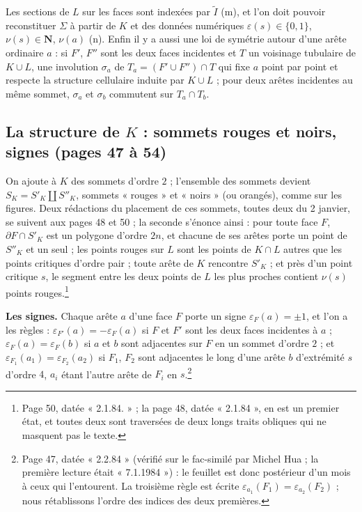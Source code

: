 \documentclass[11pt,a4paper]{article}
\begin{document}
Les sections de $L$ sur les faces
sont indexées par $\widetilde{I}$ (m), et l'on doit pouvoir reconstituer
$\Sigma$ à partir de $K$ et des données numériques $\varepsilon(s) \in \lbrace
0, 1 \rbrace$, $\nu(s) \in \mathbf{N}$, $\nu(a)$ (n). Enfin il y a aussi une loi
de symétrie autour d'une arête ordinaire $a$ : si $F'$, $F''$ sont les deux
faces incidentes et $T$ un voisinage tubulaire de $K \cup L$, une involution
$\sigma_a$ de $T_a = (F' \cup F'') \cap T$ qui fixe $a$ point par point et
respecte la structure cellulaire induite par $K \cup L$ ; pour deux arêtes
incidentes au même sommet, $\sigma_a$ et $\sigma_b$ commutent sur $T_a \cap T_b$.

\subsection*{La structure de $K$ : sommets rouges et noirs, signes (pages 47 à 54)}

On ajoute à $K$ des sommets d'ordre $2$ ; l'ensemble des sommets devient $S_K =
S'_K \amalg S''_K$, sommets « rouges » et « noirs » (ou orangés), comme sur les
figures. Deux rédactions du placement de ces sommets, toutes deux du 2 janvier,
se suivent aux pages 48 et 50 ; la seconde s'énonce ainsi : pour toute face $F$,
$\partial F \cap S'_K$ est un polygone d'ordre $2n$, et chacune de ses arêtes
porte un point de $S''_K$ et un seul ; les points rouges sur $L$ sont les points
de $K \cap L$ autres que les points critiques d'ordre pair ; toute arête de $K$
rencontre $S'_K$ ; et près d'un point critique $s$, le segment entre les deux
points de $L$ les plus proches contient $\nu(s)$ points rouges.\footnote{Page 50,
datée « 2.1.84. » ; la page 48, datée « 2.1.84 », en est un premier état, et
toutes deux sont traversées de deux longs traits obliques qui ne masquent pas
le texte.}

\textbf{Les signes.} Chaque arête $a$ d'une face $F$ porte un signe
$\varepsilon_F(a) = \pm 1$, et l'on a les règles : $\varepsilon_{F'}(a) =
-\varepsilon_F(a)$ si $F$ et $F'$ sont les deux faces incidentes à $a$ ;
$\varepsilon_F(a) = \varepsilon_F(b)$ si $a$ et $b$ sont adjacentes sur $F$ en un
sommet d'ordre $2$ ; et $\varepsilon_{F_1}(a_1) = \varepsilon_{F_2}(a_2)$ si
$F_1$, $F_2$ sont adjacentes le long d'une arête $b$ d'extrémité $s$ d'ordre $4$,
$a_i$ étant l'autre arête de $F_i$ en $s$.\footnote{Page 47, datée « 2.2.84 »
(vérifié sur le fac-similé par Michel Hua ; la première lecture était
« 7.1.1984 ») : le feuillet est donc postérieur d'un mois à ceux qui
l'entourent. La troisième règle est écrite $\varepsilon_{a_1}(F_1) =
\varepsilon_{a_2}(F_2)$ ; nous rétablissons l'ordre des indices des deux
premières.}
\end{document}
